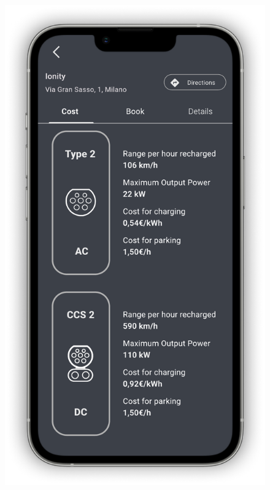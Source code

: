 \begin{figure}[H]
{        \includegraphics[scale=0.32,page=1]{src/mockups/book_cost.pdf}
    }
    \newline
\end{figure}

